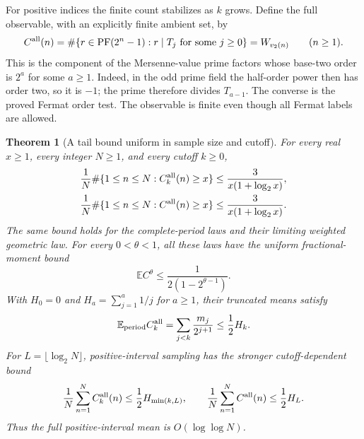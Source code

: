 \documentclass[11pt]{article}
\newtheorem{theorem}{Theorem}[section]
\theoremstyle{definition}
\begin{document}
For positive indices the finite count stabilizes as $k$ grows.
Define the full observable, with an explicitly finite ambient set,
by
\[
 C^{\rm all}(n)=
 \#\{r\in\operatorname{PF}(2^n-1):
       r\mid T_j\text{ for some }j\ge0\}
 =W_{v_2(n)}\qquad(n\ge1).
\]
This is the component of the Mersenne-value prime factors whose
base-two order is $2^a$ for some $a\ge1$. Indeed, in the odd
prime field the half-order power then has order two, so it is
$-1$; the prime therefore divides $T_{a-1}$. The converse is
the proved Fermat order test. The observable is finite even
though all Fermat labels are allowed.

\begin{theorem}[A tail bound uniform in sample size and cutoff]
\label{thm:full-fermat-tail}
For every real $x\ge1$, every integer $N\ge1$, and every
cutoff $k\ge0$,
\begin{align*}
 \frac1N\#\{1\le n\le N:C_k^{\rm all}(n)\ge x\}
 &\le \frac{3}{x(1+\log_2 x)},\\
 \frac1N\#\{1\le n\le N:C^{\rm all}(n)\ge x\}
 &\le \frac{3}{x(1+\log_2 x)}.
\end{align*}
The same bound holds for the complete-period laws and their
limiting weighted geometric law.
For every $0<\theta<1$, all these laws have the uniform
fractional-moment bound
\[
 \mathbb E C^\theta
 \le\frac{1}{2(1-2^{\theta-1})}.
\]
With $H_0=0$ and $H_a=\sum_{j=1}^a1/j$ for $a\ge1$,
their truncated means satisfy
\[
 \mathbb E_{\rm period} C_k^{\rm all}
   =\sum_{j<k}\frac{m_j}{2^{j+1}}\le\frac12 H_k.
\]
For $L=\lfloor\log_2 N\rfloor$, positive-interval sampling has
the stronger cutoff-dependent bound
\[
 \frac1N\sum_{n=1}^N C_k^{\rm all}(n)
 \le\frac12 H_{\min(k,L)},\qquad
 \frac1N\sum_{n=1}^N C^{\rm all}(n)
 \le\frac12 H_L.
\]
Thus the full positive-interval mean is $O(\log\log N)$.
\end{theorem}
\end{document}
